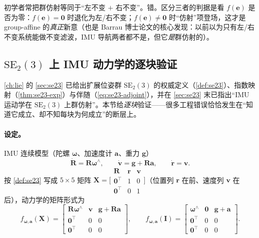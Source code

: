 \begin{pitfall}
初学者常把群仿射等同于“左不变 $+$ 右不变”。错。区分三者的判据是看 $f(\mathbf{e})$ 是否为零：$f(\mathbf{e})=\mathbf{0}$ 时退化为左/右不变；$f(\mathbf{e})\neq\mathbf{0}$ 时“仿射”项登场，这才是 group-affine 的\emph{真正}新意（也是 Barrau 博士论文的核心发现：以前以为只有左/右不变系统能做不变滤波，IMU 导航两者都不是，但它\emph{是}群仿射的）。
\end{pitfall}

\subsection{\texorpdfstring{$\mathrm{SE}_2(3)$}{SE2(3)} 上 IMU 动力学的逐块验证}
\label{subsec:se23-verify}

\cref{ch:lie} 的 \cref{sec:se23} 已给出扩展位姿群 $\mathrm{SE}_2(3)$ 的权威定义（\cref{def:se23}）、指数映射（\cref{thm:se23-exp}）与伴随（\cref{eq:se23-adjoint}），并在 \cref{sec:se23} 末已指出“IMU 运动学在 $\mathrm{SE}_2(3)$ 上群仿射”。本节给\emph{逐块}验证——很多工程错误恰恰发生在“知道它成立、却不知每块为何成立”的断层上。

\paragraph{设定。}IMU 连续模型（陀螺 $\boldsymbol{\omega}$、加速度计 $\mathbf{a}$、重力 $\mathbf{g}$）
\begin{equation}
  \dot{\mathbf{R}}=\mathbf{R}\boldsymbol{\omega}^\wedge,\qquad \dot{\mathbf{v}}=\mathbf{g}+\mathbf{R}\mathbf{a},\qquad \dot{\mathbf{r}}=\mathbf{v}.
  \label{eq:imu-kin}
\end{equation}
按 \cref{def:se23} 写成 $5\times5$ 矩阵 $\mathbf{X}=\big[\begin{smallmatrix}\mathbf{R}&\mathbf{r}&\mathbf{v}\\\mathbf{0}^\top&1&0\\\mathbf{0}^\top&0&1\end{smallmatrix}\big]$（位置列 $\mathbf{r}$ 在前、速度列 $\mathbf{v}$ 在后），动力学的矩阵形式为
\begin{equation}
  f_{\boldsymbol{\omega},\mathbf{a}}(\mathbf{X})=\begin{bmatrix}\mathbf{R}\boldsymbol{\omega}^\wedge&\mathbf{v}&\mathbf{g}+\mathbf{R}\mathbf{a}\\\mathbf{0}^\top&0&0\\\mathbf{0}^\top&0&0\end{bmatrix},\qquad
  f_{\boldsymbol{\omega},\mathbf{a}}(\mathbf{I})=\begin{bmatrix}\boldsymbol{\omega}^\wedge&\mathbf{0}&\mathbf{g}+\mathbf{a}\\\mathbf{0}^\top&0&0\\\mathbf{0}^\top&0&0\end{bmatrix}.
  \label{eq:imu-matrix-f}
\end{equation}

